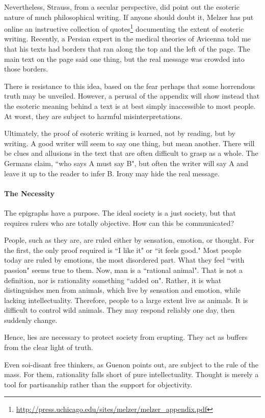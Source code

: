 Nevertheless, Strauss, from a secular perspective, did point out the esoteric nature of much philosophical writing. If anyone should doubt it, Melzer has put online an instructive collection of quotes\footnote{\url{http://press.uchicago.edu/sites/melzer/melzer_appendix.pdf}} documenting the extent of esoteric writing. Recently, a Persian expert in the medical theories of Avicenna told me that his texts had borders that ran along the top and the left of the page. The main text on the page said one thing, but the real message was crowded into those borders.

There is resistance to this idea, based on the fear perhaps that some horrendous truth may be unveiled. However, a perusal of the appendix will show instead that the esoteric meaning behind a text is at best simply inaccessible to most people. At worst, they are subject to harmful misinterpretations.

Ultimately, the proof of esoteric writing is learned, not by reading, but by writing. A good writer will seem to say one thing, but mean another. There will be clues and allusions in the text that are often difficult to grasp as a whole. The Germans claim, ``who says A must say B", but often the writer will say A and leave it up to the reader to infer B. Irony may hide the real message.

\paragraph{The Necessity}
The epigraphs have a purpose. The ideal society is a just society, but that requires rulers who are totally objective. How can this be communicated?

People, such as they are, are ruled either by sensation, emotion, or thought. For the first, the only proof required is ``I like it" or ``it feels good." Most people today are ruled by emotions, the most disordered part. What they feel ``with passion" seems true to them. Now, man is a ``rational animal". That is not a definition, nor is rationality something ``added on". Rather, it is what distinguishes men from animals, which live by sensation and emotion, while lacking intellectuality. Therefore, people to a large extent live as animals. It is difficult to control wild animals. They may respond reliably one day, then suddenly change.

Hence, lies are necessary to protect society from erupting. They act as buffers from the clear light of truth.

Even soi-disant free thinkers, as Guenon points out, are subject to the rule of the mass. For them, rationality falls short of pure intellectuality. Thought is merely a tool for partisanship rather than the support for objectivity.

